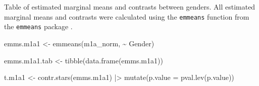\documentclass[
  bookmarksnumbered]{article}
\newenvironment{Shaded}{\begin{snugshade}}{\end{snugshade}}
\newcommand{\AttributeTok}[1]{\textcolor[rgb]{0.80,0.80,0.80}{#1}}
\newcommand{\FunctionTok}[1]{\textcolor[rgb]{0.94,0.94,0.56}{#1}}
\newcommand{\NormalTok}[1]{\textcolor[rgb]{0.80,0.80,0.80}{#1}}
\newcommand{\OtherTok}[1]{\textcolor[rgb]{0.94,0.94,0.56}{#1}}
\newcommand{\SpecialCharTok}[1]{\textcolor[rgb]{0.86,0.64,0.64}{#1}}
\begin{document}
Table of estimated marginal means and contrasts between genders. All estimated marginal means and contrasts were calculated using the \texttt{emmeans} function from the \texttt{emmeans} package \autocite{emmeanscit}.

\begin{Shaded}
\begin{Highlighting}[]
\NormalTok{emms.m1a1 }\OtherTok{\textless{}{-}} \FunctionTok{emmeans}\NormalTok{(m1a\_norm, }\SpecialCharTok{\textasciitilde{}}\NormalTok{ Gender)}

\NormalTok{emms.m1a1.tab }\OtherTok{\textless{}{-}} \FunctionTok{tibble}\NormalTok{(}\FunctionTok{data.frame}\NormalTok{(emms.m1a1))}

\NormalTok{t.m1a1 }\OtherTok{\textless{}{-}} \FunctionTok{contr.stars}\NormalTok{(emms.m1a1) }\SpecialCharTok{|\textgreater{}} 
  \FunctionTok{mutate}\NormalTok{(}\AttributeTok{p.value =} \FunctionTok{pval.lev}\NormalTok{(p.value))}


\end{Highlighting}
\end{Shaded}
\end{document}
